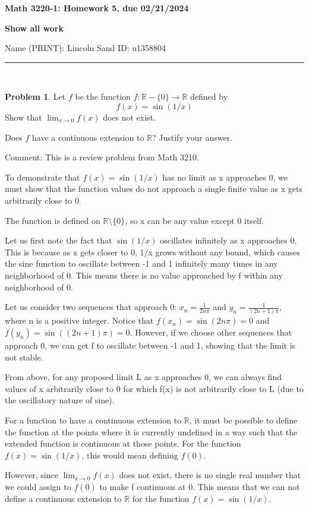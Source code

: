 \documentclass[12]{amsart}
\theoremstyle{definition}
\newtheorem{xca}{Problem}
\newcommand{\R}{\mathbb{R}}
\begin{document}
\centerline{ \bf Math 3220-1: Homework 5, due 02/21/2024}
\bigskip
\centerline{ \bf Show all work}
\bigskip
\noindent Name (PRINT): Lincoln Sand \hskip 2.5in ID: u1358804
\smallskip

\hrule

\bigskip
\
\begin{xca} %
Let  $f$ be the function $f:\R-\{0\}\to \R$ defined by
$$
f(x)=\sin{(1/x)}
$$
Show that $\lim_{x\to 0}f(x)$ does not exist.

\bigskip
Does $f$ have a continuous extension to $\R$?  Justify your answer.

\bigskip
Comment: This is a review problem from Math 3210.

\end{xca}


To demonstrate that $f(x) = \sin(1/x)$ has no limit as x approaches 0,
we must show that the function values do not approach a single finite value
as x gets arbitrarily close to 0.

The function is defined on $\R \setminus \{0\}$, so x can be any value except 0 itself.

Let us first note the fact that $\sin(1/x)$ oscillates infinitely as x approaches 0.
This is because as x gets closer to 0, 1/x grows without any bound, which causes
the sine function to oscillate between -1 and 1 infinitely many times in any
neighborhood of 0. This means there is no value approached by f within
any neighborhood of 0.

Let us consider two sequences that approach 0: $x_n = \frac{1}{2 n \pi}$ and
$y_n = \frac{1}{(2 n + 1) \pi}$, where n is a positive integer.
Notice that $f(x_n) = \sin(2 n \pi) = 0$ and $f(y_n) = \sin((2 n + 1) \pi) = 0$.
However, if we choose other sequences that approach 0, we can get f to oscillate
between -1 and 1, showing that the limit is not stable.

From above, for any proposed limit L as x approaches 0, we can always find
values of x arbitrarily close to 0 for which f(x) is not arbitrarily close
to L (due to the oscillatory nature of sine).


For a function to have a continuous extension to $\R$, it must be possible
to define the function at the points where it is currently undefined in a way
such that the extended function is continuous at those points. For the function
$f(x) = \sin(1/x)$, this would mean defining $f(0)$.

However, since $\lim_{x \to 0} f(x)$ does not exist, there is no single real number
that we could assign to $f(0)$ to make f continuous at 0. This means that we can not
define a continuous extension to $\R$ for the function $f(x) = \sin(1/x)$.
\end{document}
